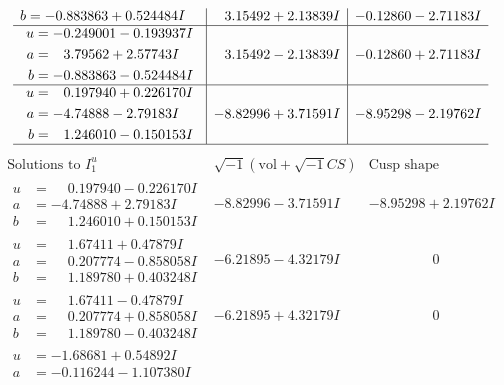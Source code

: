 \documentclass[1p]{elsarticle_modified}
\theoremstyle{definition}
\newcommand{\I}{\sqrt{-1}}
\begin{document}
$$\begin{array}{c|c|c}
\begin{aligned}
b &= -0.883863 + 0.524484 I\end{aligned}
 & \phantom{-}3.15492 + 2.13839 I & -0.12860 - 2.71183 I \\ \hline\begin{aligned}
u &= -0.249001 - 0.193937 I \\
a &= \phantom{-}3.79562 + 2.57743 I \\
b &= -0.883863 - 0.524484 I\end{aligned}
 & \phantom{-}3.15492 - 2.13839 I & -0.12860 + 2.71183 I \\ \hline\begin{aligned}
u &= \phantom{-}0.197940 + 0.226170 I \\
a &= -4.74888 - 2.79183 I \\
b &= \phantom{-}1.246010 - 0.150153 I\end{aligned}
 & -8.82996 + 3.71591 I & -8.95298 - 2.19762 I\\
 \hline 
 \end{array}$$\newpage$$\begin{array}{c|c|c}  
\text{Solutions to }I^u_{1}& \I (\text{vol} + \sqrt{-1}CS) & \text{Cusp shape}\\
 \hline 
\begin{aligned}
u &= \phantom{-}0.197940 - 0.226170 I \\
a &= -4.74888 + 2.79183 I \\
b &= \phantom{-}1.246010 + 0.150153 I\end{aligned}
 & -8.82996 - 3.71591 I & -8.95298 + 2.19762 I \\ \hline\begin{aligned}
u &= \phantom{-}1.67411 + 0.47879 I \\
a &= \phantom{-}0.207774 - 0.858058 I \\
b &= \phantom{-}1.189780 + 0.403248 I\end{aligned}
 & -6.21895 - 4.32179 I & \phantom{-0.000000 } 0 \\ \hline\begin{aligned}
u &= \phantom{-}1.67411 - 0.47879 I \\
a &= \phantom{-}0.207774 + 0.858058 I \\
b &= \phantom{-}1.189780 - 0.403248 I\end{aligned}
 & -6.21895 + 4.32179 I & \phantom{-0.000000 } 0 \\ \hline\begin{aligned}
u &= -1.68681 + 0.54892 I \\
a &= -0.116244 - 1.107380 I \\

\end{aligned}
\end{array}$$
\end{document}
